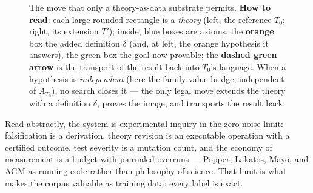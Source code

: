 \documentclass[11pt]{article}
\theoremstyle{remark}\newtheorem{example}{Example}
\begin{document}
\begin{figure}[t]\centering
{}
\caption{The move that only a theory-as-data substrate permits. \textbf{How to read}:
each large rounded rectangle is a \emph{theory} (left, the reference $T_0$; right,
its extension $T'$); inside, blue boxes are axioms, the \textbf{orange} box the added
definition $\delta$ (and, at left, the orange hypothesis it answers), the green box
the goal now provable; the \textbf{dashed green arrow} is the transport of the result
back into $T_0$'s language. When a hypothesis is \emph{independent} (here the
family-value bridge, independent of $A_{T_0}$), no search closes it --- the only legal move extends the theory with a
definition $\delta$, proves the image, and transports the result back.}
\label{fig:extension}
\end{figure}

Read abstractly, the system is experimental inquiry in the zero-noise limit:
falsification is a derivation, theory revision is an executable operation with a
certified outcome, test severity is a mutation count, and the economy of measurement
is a budget with journaled overruns --- Popper, Lakatos, Mayo, and AGM as running
code rather than philosophy of science. That limit is what makes the corpus valuable
as training data: every label is exact.
\end{document}
